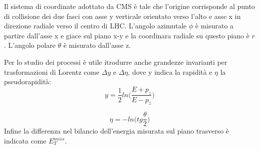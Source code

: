 Il sistema di coordinate adottato da CMS è tale che l'origine corrisponde al punto di collisione dei due fasci con asse y verticale orientato verso l'alto e asse x in direzione radiale verso il centro di LHC. L'angolo azimutale $\phi$ è misurato a partire dall'asse x e giace sul piano x-y e la coordinara radiale su questo piano è $r$. L'angolo polare $\theta$ è misurato dall'asse z. 

Per lo studio dei processi è utile itrodurre anche grandezze invarianti per trasformazioni di Lorentz come $\Delta y$ e $\Delta \eta$, dove y indica la rapidità e $\eta$ la pseudorapidità:
\begin{equation}
y= \dfrac{1}{2} ln\Big( \dfrac{E+p_z}{E-p_z}\Big)
\end{equation}

\begin{equation}
\eta = - ln \Big( tg\frac{\theta}{2}\Big)
\end{equation}
Infine la differenza nel bilancio dell'energia misurata sul piano trasverso è indicata come $E_T^{miss}$.


